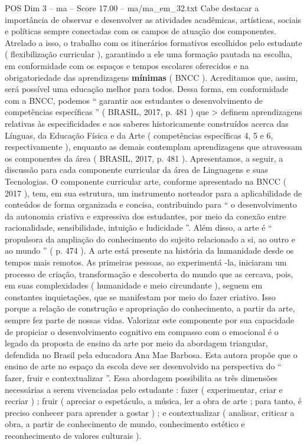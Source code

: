 \begin{textsample}{POS Dim 3 – ma – Score 17.00 – ma/ma\_em\_32.txt}
Cabe destacar a importância de observar e desenvolver as atividades acadêmicas, artísticas, sociais e políticas sempre conectadas com os campos de atuação dos componentes.
Atrelado a isso, o trabalho com os itinerários formativos escolhidos pelo estudante ( flexibilização curricular ), garantindo a ele uma formação pautada na escolha, em conformidade com os espaços e tempos escolares oferecidos e na obrigatoriedade das aprendizagens \textbf{mínimas} ( BNCC ).
Acreditamos que, assim, será possível uma educação melhor para todos.
Dessa forma, em conformidade com a BNCC, podemos “ garantir aos estudantes o desenvolvimento de competências específicas ” ( BRASIL, 2017, p. 481 ) que > definem aprendizagens relativas às especificidades e aos saberes historicamente construídos acerca das Línguas, da Educação Física e da Arte ( competências específicas 4, 5 e 6, respectivamente ), enquanto as demais contemplam aprendizagens que atravessam os componentes da área ( BRASIL, 2017, p. 481 ).
Apresentamos, a seguir, a discussão para cada componente curricular da área de Linguagens e suas Tecnologias.
O componente curricular arte, conforme apresentado na BNCC ( 2017 ), tem, em sua estrutura, um instrumento norteador para a aplicabilidade de conteúdos de forma organizada e concisa, contribuindo para “ o desenvolvimento da autonomia criativa e expressiva dos estudantes, por meio da conexão entre racionalidade, sensibilidade, intuição e ludicidade ”.
Além disso, a arte é “ propulsora da ampliação do conhecimento do sujeito relacionado a si, ao outro e ao mundo ” ( p. 474 ).
A arte está presente na história da humanidade desde os tempos mais remotos.
As primeiras pessoas, ao experimentá -la, iniciaram um processo de criação, transformação e descoberta do mundo que as cercava, pois, em suas complexidades ( humanidade e meio circundante ), seguem em constantes inquietações, que se manifestam por meio do fazer criativo.
Isso porque a relação de construção e apropriação do conhecimento, a partir da arte, sempre fez parte de nossas vidas.
Valorizar este componente por sua capacidade de propiciar o desenvolvimento cognitivo em compasso com o emocional é o legado da proposta de ensino da arte por meio da abordagem triangular, defendida no Brasil pela educadora Ana Mae Barbosa.
Esta autora propõe que o ensino de arte no espaço da escola deve ser desenvolvido na perspectiva do “ fazer, fruir e contextualizar ”.
Essa abordagem possibilita as três dimensões necessárias a serem vivenciadas pelo estudante : fazer ( experimentar, criar e recriar ) ; fruir ( apreciar o espetáculo, a música, ler a obra de arte ; para tanto, é preciso conhecer para aprender a gostar ) ; e contextualizar ( analisar, criticar a obra, a partir de conhecimento de mundo, conhecimento estético e reconhecimento de valores culturais ).

\end{textsample}
